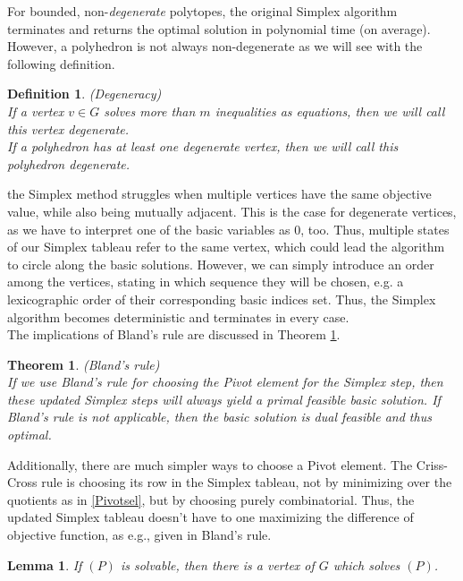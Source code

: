 \documentclass[a4paper, 11pt]{article}
\newtheorem{mydef}{Definition}
\newtheorem{lemma}{Lemma}
\newtheorem{theorem}{Theorem}
\begin{document}
For bounded, non-\textit{degenerate} polytopes, the original Simplex algorithm terminates and returns the optimal solution in polynomial time (on average). However, a polyhedron is not always non-degenerate as we will see with the following definition.

\begin{mydef}(Degeneracy)\\
	If a vertex $v\in G$ solves more than $m$ inequalities as equations, then we will call this vertex \emph{degenerate}. \\
	If a polyhedron has at least one degenerate vertex, then we will call this polyhedron \emph{degenerate}.
\end{mydef}

the Simplex method struggles when multiple vertices have the same objective value, while also being mutually adjacent. This is the case for degenerate vertices, as we have to interpret one of the basic variables as $0$, too. Thus, multiple states of our Simplex tableau refer to the same vertex, which could lead the algorithm to circle along the basic solutions. However, we can simply introduce an order among the vertices, stating in which sequence they will be chosen, e.g. a lexicographic order of their corresponding basic indices set. Thus, the Simplex algorithm becomes deterministic and terminates in every case.\\

The implications of Bland's rule are discussed in Theorem \ref{Bland}.

\begin{theorem}(Bland's rule)\\
	\label{Bland}
	If we use Bland's rule for choosing the Pivot element for the Simplex step, then these updated Simplex steps will always yield a primal feasible basic solution. If Bland's rule is not applicable, then the basic solution is dual feasible and thus optimal.
\end{theorem}

Additionally, there are much simpler ways to choose a Pivot element. The Criss-Cross rule is choosing its row in the Simplex tableau, not by minimizing over the quotients as in \ref{Pivotsel}, but by choosing purely combinatorial. Thus, the updated Simplex tableau doesn't have to one maximizing the difference of objective function, as e.g., given in Bland's rule. 

\begin{lemma}
	\label{theo4}
	If $(P)$ is solvable, then there is a vertex of $G$ which solves $(P)$.
\end{lemma}
\end{document}
